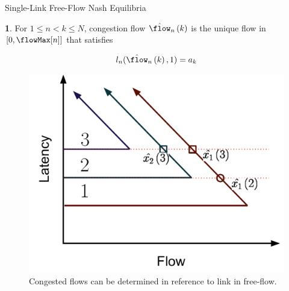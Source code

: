 \documentclass[xcolor=svgnames, english, smaller]{beamer}
\theoremstyle{plain}
\theoremstyle{definition}
\newtheorem{defn}[thm]{\protect\definitionname}
\theoremstyle{plain}
\theoremstyle{plain}
\providecommand{\definitionname}{Definition}
\begin{document}
\begin{frame}{Single-Link Free-Flow Nash Equilibria}
\begin{defn}
For $1\leq n<k\leq N$, congestion flow $\cffFlow nk$ is the unique
flow in $[0,\flowMax[n]]$ that satisfies

\[
l_{n}(\cffFlow nk,1)=a_{k}
\]

\end{defn}
\begin{figure}
\begin{centering}
\includegraphics[scale=0.25]{../../figures/presentation/DefinitionXHat}
\par\end{centering}

\caption{Congested flows can be determined in reference to link in free-flow.}
\end{figure}



\end{frame}
\end{document}

